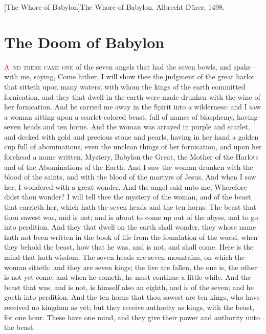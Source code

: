 [The Whore of Babylon]{The Whore of Babylon. Albrecht Dürer, 1498.}

\chapter{The Doom of Babylon}
\lettrine[lines=3,slope=-0.5em]{\textcolor{red}{A}}{\ nd there came one} of the seven angels that had the seven bowls, and spake with me, saying, Come hither, I will show thee the judgment of the great harlot that sitteth upon many waters; 
 with whom the kings of the earth committed fornication, and they that dwell in the earth were made drunken with the wine of her fornication. 
 And he carried me away in the Spirit into a wilderness: and I saw a woman sitting upon a scarlet-colored beast, full of names of blasphemy, having seven heads and ten horns. 
 And the woman was arrayed in purple and scarlet, and decked with gold and precious stone and pearls, having in her hand a golden cup full of abominations, even the unclean things of her fornication, 
 and upon her forehead a name written, Mystery, Babylon the Great, the Mother of the Harlots and of the Abominations of the Earth. 
 And I saw the woman drunken with the blood of the saints, and with the blood of the martyrs of Jesus. And when I saw her, I wondered with a great wonder. 
 And the angel said unto me, Wherefore didst thou wonder? I will tell thee the mystery of the woman, and of the beast that carrieth her, which hath the seven heads and the ten horns. 
 The beast that thou sawest was, and is not; and is about to come up out of the abyss, and to go into perdition. And they that dwell on the earth shall wonder, they whose name hath not been written in the book of life from the foundation of the world, when they behold the beast, how that he was, and is not, and shall come. 
 Here is the mind that hath wisdom. The seven heads are seven mountains, on which the woman sitteth: 
 and they are seven kings; the five are fallen, the one is, the other is not yet come; and when he cometh, he must continue a little while. 
 And the beast that was, and is not, is himself also an eighth, and is of the seven; and he goeth into perdition. 
 And the ten horns that thou sawest are ten kings, who have received no kingdom as yet; but they receive authority as kings, with the beast, for one hour. 
 These have one mind, and they give their power and authority unto the beast. 

